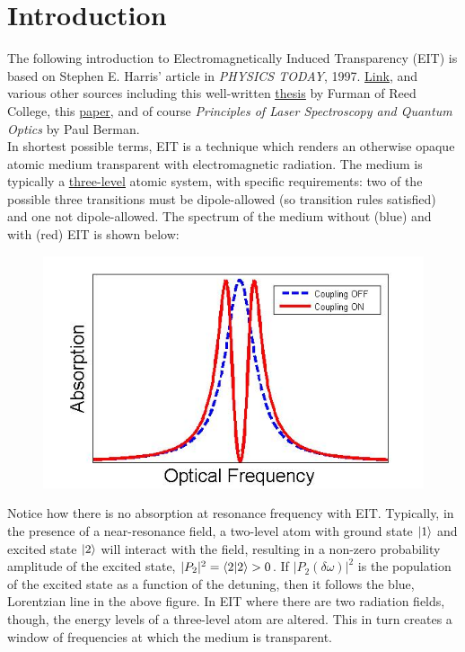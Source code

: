\documentclass{article}
\theoremstyle{definition}
\begin{document}
\section{Introduction}
The following introduction to Electromagnetically Induced Transparency (EIT) is based on Stephen E. Harris' article in \textit{PHYSICS TODAY}, 1997. \href{https://web.stanford.edu/group/harrisgroup/PAPERS/review.pdf}{\underline{Link}}, and various other sources including this well-written \href{https://www.reed.edu/physics/faculty/illing/campus/pdf/FurmanThesis16.pdf}{\underline{thesis}} by Furman of Reed College, this \href{https://www.kip.uni-heidelberg.de/kw/image/f/group/f17/files/F65_EIT_Anleitung.pdf}{paper}, and of course \textit{Principles of Laser Spectroscopy and Quantum Optics} by Paul Berman.\\

In shortest possible terms, EIT is a technique which renders an otherwise opaque atomic medium transparent with electromagnetic radiation. The medium is typically a \href{http://community.dur.ac.uk/thomas.billam/JQC_Atom_Light_2015-2016_L7.pdf}{\underline{three-level}} atomic system, with specific requirements: two of the possible three transitions must be dipole-allowed (so transition rules satisfied) and one not dipole-allowed. The spectrum of the medium without (blue) and with (red) EIT is shown below:
\begin{figure}[h!]
\centering
\includegraphics[scale=0.5]{EIT_spectrum.jpg}
\caption{}
\end{figure}

Notice how there is no absorption at resonance frequency with EIT. Typically, in the presence of a near-resonance field, a two-level atom with ground state $\ket{1}$ and excited state $\ket{2}$ will interact with the field, resulting in a non-zero probability amplitude of the excited state, $\vert P_2\vert^2 = \bra{2}\ket{2} > 0$. If $\vert P_2(\delta\omega) \vert^2$ is the population of the excited state as a function of the detuning, then it follows the blue, Lorentzian line in the above figure. In EIT where there are two radiation fields, though, the energy levels of a three-level atom are altered. This in turn creates a window of frequencies at which the medium is transparent. \\
\end{document}
